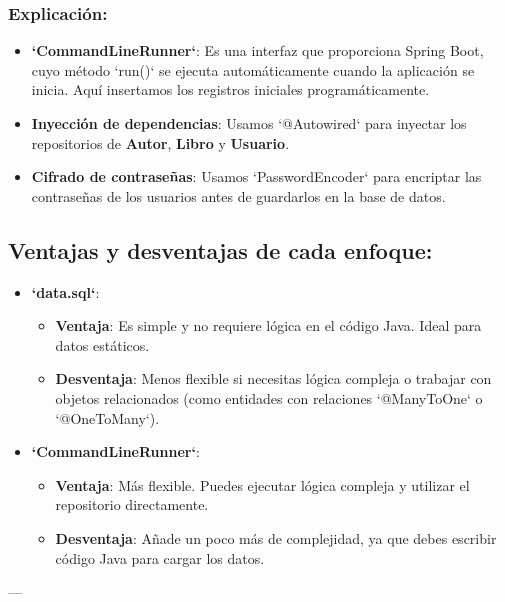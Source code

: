 \documentclass[11pt]{article}
\begin{document}
\subsubsection{Explicación:}
\label{sec:orgda82a09}
\begin{itemize}
\item \textbf{\textbf{`CommandLineRunner`}}: Es una interfaz que proporciona Spring Boot, cuyo método `run()` se ejecuta automáticamente cuando la aplicación se inicia. Aquí insertamos los registros iniciales programáticamente.
\item \textbf{\textbf{Inyección de dependencias}}: Usamos `@Autowired` para inyectar los repositorios de \textbf{\textbf{Autor}}, \textbf{\textbf{Libro}} y \textbf{\textbf{Usuario}}.
\item \textbf{\textbf{Cifrado de contraseñas}}: Usamos `PasswordEncoder` para encriptar las contraseñas de los usuarios antes de guardarlos en la base de datos.
\end{itemize}

\subsection{Ventajas y desventajas de cada enfoque:}
\label{sec:org5295a55}
\begin{itemize}
\item \textbf{\textbf{`data.sql`}}:
\begin{itemize}
\item \textbf{\textbf{Ventaja}}: Es simple y no requiere lógica en el código Java. Ideal para datos estáticos.
\item \textbf{\textbf{Desventaja}}: Menos flexible si necesitas lógica compleja o trabajar con objetos relacionados (como entidades con relaciones `@ManyToOne` o `@OneToMany`).
\end{itemize}

\item \textbf{\textbf{`CommandLineRunner`}}:
\begin{itemize}
\item \textbf{\textbf{Ventaja}}: Más flexible. Puedes ejecutar lógica compleja y utilizar el repositorio directamente.
\item \textbf{\textbf{Desventaja}}: Añade un poco más de complejidad, ya que debes escribir código Java para cargar los datos.
\end{itemize}
\end{itemize}

---
\end{document}
